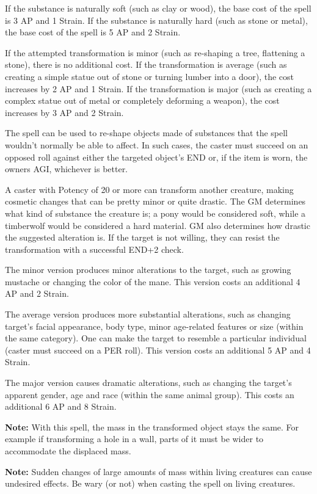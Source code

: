 \documentclass[11pt,a4paper,twocolumn]{book}
\begin{document}
If the substance is naturally soft (such as clay or wood), the base cost of the spell is 3 AP and 1 Strain. If the substance is naturally hard (such as stone or metal), the base cost of the spell is 5 AP and 2 Strain.

If the attempted transformation is minor (such as re-shaping a tree, flattening a stone), there is no additional cost. If the transformation is average (such as creating a simple statue out of stone or turning lumber into a door), the cost increases by 2 AP and 1 Strain. If the transformation is major (such as creating a complex statue out of metal or completely deforming a weapon), the cost increases by 3 AP and 2 Strain.

The spell can be used to re-shape objects made of substances that the spell wouldn't normally be able to affect. In such cases, the caster must succeed on an opposed roll against either the targeted object's END or, if the item is worn, the owners AGI, whichever is better.
	
A caster with Potency of 20 or more can transform another creature, making cosmetic changes that can be pretty minor or quite drastic. The GM determines what kind of substance the creature is; a pony would be considered soft, while a timberwolf would be considered a hard material. GM also determines how drastic the suggested alteration is. If the target is not willing, they can resist the transformation with a successful END+2 check.

The minor version produces minor alterations to the target, such as growing mustache or changing the color of the mane. This version costs an additional 4 AP and 2 Strain.

The average version produces more substantial alterations, such as changing target's facial appearance, body type, minor age-related features or size (within the same category). One can make the target to resemble a particular individual (caster must succeed on a PER roll). This version costs an additional 5 AP and 4 Strain.

The major version causes dramatic alterations, such as changing the target's apparent gender, age and race (within the same animal group). This costs an additional 6 AP and 8 Strain.

\textbf{Note:} With this spell, the mass in the transformed object stays the same. For example if transforming a hole in a wall, parts of it must be wider to accommodate the displaced mass.

\textbf{Note:} Sudden changes of large amounts of mass within living creatures can cause undesired effects. Be wary (or not) when casting the spell on living creatures.
\end{document}
